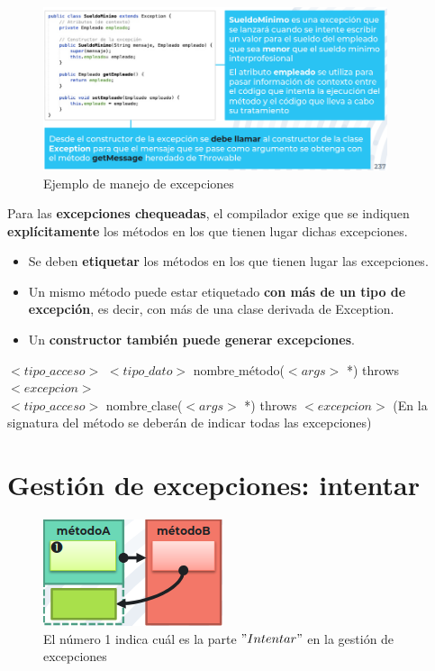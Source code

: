 \documentclass{article}
\begin{document}
\begin{figure}[h]
    \centering
    \includegraphics[width=0.9\textwidth]{img-t7/img_747_39.png}
    \caption{Ejemplo de manejo de excepciones}
\end{figure}

Para las \textbf{excepciones chequeadas}, el compilador exige que se indiquen \textbf{explícitamente} los métodos en los que tienen lugar dichas excepciones.
\begin{itemize}
    \item Se deben \textbf{etiquetar} los métodos en los que tienen lugar las excepciones.
    \item Un mismo método puede estar etiquetado \textbf{con más de un tipo de excepción}, es decir, con más de una clase derivada de Exception.
    \item Un \textbf{constructor también puede generar excepciones}.
\end{itemize}
$<tipo\_acceso>$ $<tipo\_dato>$ nombre$\_$método($<args>$ *) throws $<excepcion>$ \\
$<tipo\_acceso>$ nombre$\_$clase($<args>$ *) throws $<excepcion>$
(En la signatura del método se deberán de indicar todas las excepciones)

\newpage

\section{Gestión de excepciones: intentar}

\begin{figure}
    \centering
    \includegraphics[width=\linewidth]{img-t7/img_604_04.png}
    \caption{El número 1 indica cuál es la parte $"Intentar"$ en la gestión de excepciones}
\end{figure}
\end{document}
